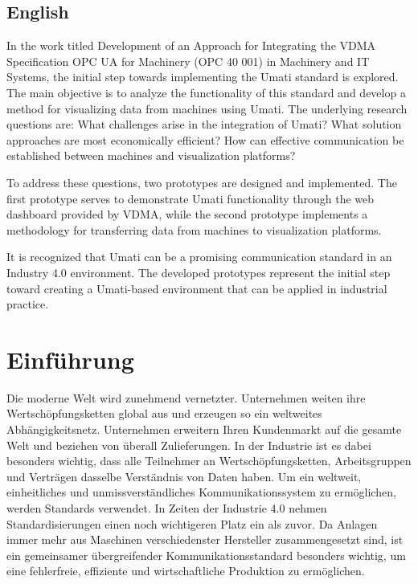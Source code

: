 \documentclass[a4paper, 12pt, oneside, toc=listofnumbered, bibliography=totoc]{scrbook}
\begin{document}
	\section*{English}
	
	In the work titled \glqq Development of an Approach for Integrating the VDMA Specification \glq OPC UA for Machinery (OPC 40 001)\grq{} in Machinery and IT Systems\grqq{}, the initial step towards implementing the Umati standard is explored. The main objective is to analyze the functionality of this standard and develop a method for visualizing data from machines using Umati. The underlying research questions are: What challenges arise in the integration of Umati? What solution approaches are most economically efficient? How can effective communication be established between machines and visualization platforms?
	
	To address these questions, two prototypes are designed and implemented. The first prototype serves to demonstrate Umati functionality through the web dashboard provided by VDMA, while the second prototype implements a methodology for transferring data from machines to visualization platforms.
	
	It is recognized that Umati can be a promising communication standard in an Industry 4.0 environment. The developed prototypes represent the initial step toward creating a Umati-based environment that can be applied in industrial practice.
	
	\mainmatter
	\pagebreak
	\chapter{Einführung}\label{ch:Einführung}
	
	Die moderne Welt wird zunehmend vernetzter. Unternehmen weiten ihre Wertschöpfungsketten global aus und erzeugen so ein weltweites Abhängigkeitsnetz. Unternehmen erweitern Ihren Kundenmarkt auf die gesamte Welt und beziehen von überall Zulieferungen. In der Industrie ist es dabei besonders wichtig, dass alle Teilnehmer an Wertschöpfungsketten, Arbeitsgruppen und Verträgen dasselbe Verständnis von Daten haben. Um ein weltweit, einheitliches und unmissverständliches Kommunikationssystem zu ermöglichen, werden Standards verwendet. In Zeiten der Industrie 4.0 nehmen Standardisierungen einen noch wichtigeren Platz ein als zuvor. Da Anlagen immer mehr aus Maschinen verschiedenster Hersteller zusammengesetzt sind, ist ein gemeinsamer übergreifender Kommunikationsstandard besonders wichtig, um eine fehlerfreie, effiziente und wirtschaftliche Produktion zu ermöglichen.
	
\end{document}

